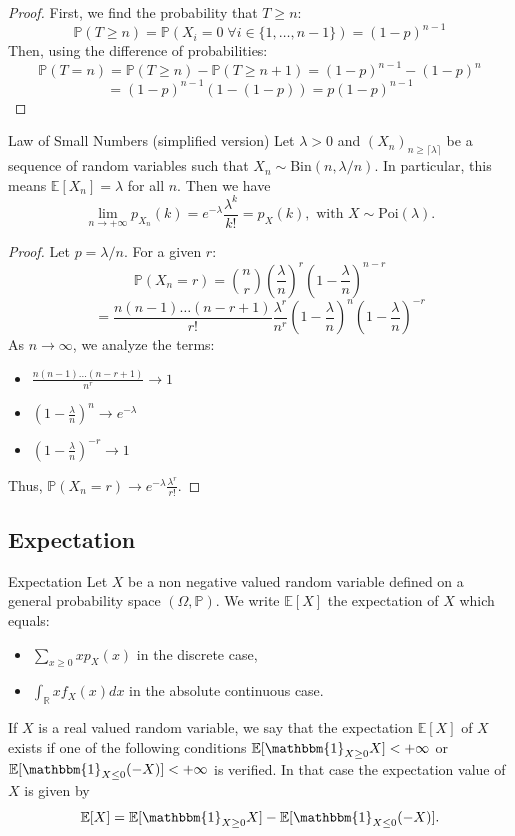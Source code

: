 \documentclass[11pt, a4paper]{article}
\begin{document}
\begin{proof}
First, we find the probability that $T \ge n$:
\[ \mathbb{P}(T \ge n) = \mathbb{P}(X_i = 0 \; \forall i \in \{1, \dots, n-1\}) = (1-p)^{n-1} \]
Then, using the difference of probabilities:
\[ \mathbb{P}(T = n) = \mathbb{P}(T \ge n) - \mathbb{P}(T \ge n+1) = (1-p)^{n-1} - (1-p)^n \]
\[ = (1-p)^{n-1} (1 - (1-p)) = p(1-p)^{n-1} \]
\end{proof}

\begin{proposition}{Law of Small Numbers (simplified version)}{}
Let $\lambda > 0$ and $(X_n)_{n \ge \lceil\lambda\rceil}$ be a sequence of random variables such that $X_n \sim \text{Bin}(n, \lambda/n)$. In particular, this means $\mathbb{E}[X_n] = \lambda$ for all $n$. Then we have
\[ \lim_{n \to +\infty} p_{X_n}(k) = e^{-\lambda} \frac{\lambda^k}{k!} = p_X(k), \text{ with } X \sim \text{Poi}(\lambda). \]
\end{proposition}

\begin{proof}
Let $p = \lambda/n$. For a given $r$:
\[ \mathbb{P}(X_n = r) = \binom{n}{r} \left(\frac{\lambda}{n}\right)^r \left(1-\frac{\lambda}{n}\right)^{n-r} \]
\[ = \frac{n(n-1)\dots(n-r+1)}{r!} \frac{\lambda^r}{n^r} \left(1-\frac{\lambda}{n}\right)^n \left(1-\frac{\lambda}{n}\right)^{-r} \]
As $n \to \infty$, we analyze the terms:
\begin{itemize}
    \item $\frac{n(n-1)\dots(n-r+1)}{n^r} \to 1$
    \item $\left(1-\frac{\lambda}{n}\right)^n \to e^{-\lambda}$
    \item $\left(1-\frac{\lambda}{n}\right)^{-r} \to 1$
\end{itemize}
Thus, $\mathbb{P}(X_n = r) \to e^{-\lambda} \frac{\lambda^r}{r!}$.
\end{proof}

\subsection{Expectation}

\begin{definition}{Expectation}{}
Let $X$ be a non negative valued random variable defined on a general probability space $(\Omega, \mathbb{P})$. We write $\mathbb{E}[X]$ the expectation of $X$ which equals:
\begin{itemize}
    \item $\sum_{x \ge 0} x p_X(x)$ in the discrete case,
    \item $\int_{\mathbb{R}} x f_X(x) dx$ in the absolute continuous case.
\end{itemize}
If $X$ is a real valued random variable, we say that the expectation $\mathbb{E}[X]$ of $X$ exists if one of the following conditions $\mathbb{E}[\mathbbm{1}_{X \ge 0} X] < +\infty$ or $\mathbb{E}[\mathbbm{1}_{X \le 0} (-X)] < +\infty$ is verified. In that case the expectation value of $X$ is given by
\[ \mathbb{E}[X] = \mathbb{E}[\mathbbm{1}_{X \ge 0} X] - \mathbb{E}[\mathbbm{1}_{X \le 0} (-X)]. \]
\end{definition}
\end{document}
